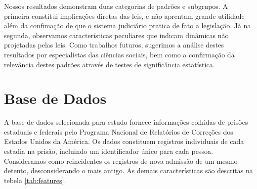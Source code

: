 \documentclass[12pt]{article}
\begin{document}
Nossos resultados demonstram duas categorias de padrões e subgrupos. A primeira constitui implicações diretas das leis, e não aprentam grande utilidade além da confimação de que o sistema judiciário pratica de fato a legislação. Já na segunda, observamos características peculiares que indicam dinâmicas não projetadas pelas leis. Como trabalhos futuros, sugerimos a análise destes resultados por especialistas das ciências sociais, bem como a confirmação da relevância destes padrões através de testes de significância estatística.

\pagebreak

\section{Base de Dados}

A base de dados selecionada para estudo fornece informações colhidas de prisões estaduais e federais pelo Programa Nacional de Relatórios de Correções dos Estados Unidos da América. \cite{dataset} Os dados constituem registros individuais de cada estadia na prisão, incluindo um identificador único para cada pessoa. Consideramos como reincidentes os registros de nova admissão de um mesmo detento, desconsiderando o mais antigo. As demais características são descritas na tebela \ref{tab:features}.
\end{document}
